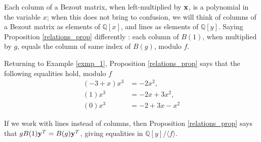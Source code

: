 \documentclass{standalone}
\begin{document}
\begin{rem}
Each column of a Bezout matrix, when left-multiplied by $\bold{x}$, is a polynomial in the variable $x$; when this does not bring to confusion, we will think of columns of a Bezout matrix as elements of $\mathbb{Q}[x]$, and lines as elements of $\mathbb{Q}[y]$.
Saying Proposition \ref{relations_prop} differently : each column of $B(1)$, when multiplied by $g$, equals the column of same index of $B(g)$, modulo $f$.
\end{rem}

\begin{exmp}
Returning to Example \ref{exmp_1}, Proposition \ref{relations_prop} says that the following equalities hold, modulo $f$
\begin{align*}
 (-3 + x)x^3 &= -2x^2, \\
 (1)x^3 &= -2x + 3x^2, \\
 (0)x^3 &= -2 + 3x - x^2
\end{align*}
\end{exmp}

\begin{rem}
If we work with lines instead of columns, then Proposition \ref{relations_prop} says that $gB(1)\bold{y}^T = B(g)\bold{y}^T$, giving equalities in $\mathbb{Q}[y]/\langle f \rangle$.
\end{rem}
\end{document}
